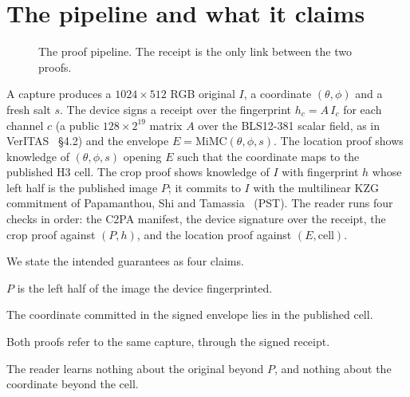 \documentclass[11pt,a4paper]{article}
\begin{document}
\section{The pipeline and what it claims}

\begin{figure}[H]
\centering
{}
\caption{The proof pipeline. The receipt is the only link between the two proofs.}
\end{figure}

A capture produces a $1024\times512$ RGB original $I$, a coordinate $(\theta,\phi)$
and a fresh salt $s$. The device signs a receipt over the fingerprint
$h_c = A\,I_c$ for each channel $c$ (a public $128\times2^{19}$ matrix $A$
over the BLS12-381 scalar field, as in VerITAS~\cite{veritas} \S4.2) and the
envelope $E=\mathrm{MiMC}(\theta,\phi,s)$. The location proof shows knowledge
of $(\theta,\phi,s)$ opening $E$ such that the coordinate maps to the published
H3 cell. The crop proof shows knowledge of $I$ with fingerprint $h$ whose left
half is the published image $P$; it commits to $I$ with the multilinear KZG
commitment of Papamanthou, Shi and Tamassia~\cite{pst} (PST). The reader runs four checks in order: the C2PA
manifest, the device signature over the receipt, the crop proof against
$(P,h)$, and the location proof against $(E,\text{cell})$.

We state the intended guarantees as four claims.
\begin{description}[itemsep=2pt]
  \item[C1, crop.] $P$ is the left half of the image the device fingerprinted.
  \item[C2, location.] The coordinate committed in the signed envelope lies in the published cell.
  \item[C3, binding.] Both proofs refer to the same capture, through the signed receipt.
  \item[C4, privacy.] The reader learns nothing about the original beyond $P$,
    and nothing about the coordinate beyond the cell.
\end{description}
\end{document}
